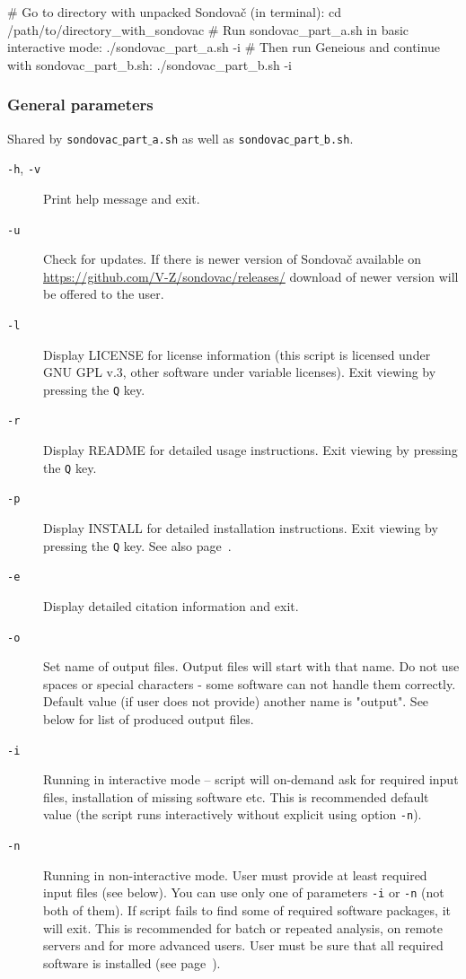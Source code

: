 \documentclass[a4paper, 11pt, twoside]{article}
\begin{document}
\begin{bashcode}
  # Go to directory with unpacked Sondovač (in terminal):
  cd /path/to/directory_with_sondovac
  # Run sondovac_part_a.sh in basic interactive mode:
  ./sondovac_part_a.sh -i
  # Then run Geneious and continue with sondovac_part_b.sh:
  ./sondovac_part_b.sh -i
\end{bashcode}

\subsubsection{General parameters}

Shared by \texttt{sondovac$\_$part$\_$a.sh} as well as \texttt{sondovac$\_$part$\_$b.sh}.

\begin{description}
  \item[\texttt{-h}, \texttt{-v}] Print help message and exit.
  \item[\texttt{-u}] Check for updates. If there is newer version of Sondovač available on \href{https://github.com/V-Z/sondovac/releases/}{https://github.com/V-Z/sondovac/releases/} download of newer version will be offered to the user.
  \item[\texttt{-l}] Display LICENSE for license information (this script is licensed under GNU GPL v.3, other software under variable licenses). Exit viewing by pressing the \texttt{Q} key.
  \item[\texttt{-r}] Display README for detailed usage instructions. Exit viewing by pressing the \texttt{Q} key.
  \item[\texttt{-p}] Display INSTALL for detailed installation instructions. Exit viewing by pressing the \texttt{Q} key. See also page~\pageref{install}.
  \item[\texttt{-e}] Display detailed citation information and exit.
  \item[\texttt{-o}] Set name of output files. Output files will start with that name. Do not use spaces or special characters - some software can not handle them correctly. Default value (if user does not provide) another name is "output". See below for list of produced output files.
  \item[\texttt{-i}] Running in interactive mode -- script will on-demand ask for required input files, installation of missing software etc. This is recommended default value (the script runs interactively without explicit using option \texttt{-n}).
  \item[\texttt{-n}] Running in non-interactive mode. User must provide at least required input files (see below). You can use only one of parameters \texttt{-i} or \texttt{-n} (not both of them). If script fails to find some of required software packages, it will exit. This is recommended for batch or repeated analysis, on remote servers and for more advanced users. User must be sure that all required software is installed (see page~\pageref{install}).
\end{description}
\end{document}
